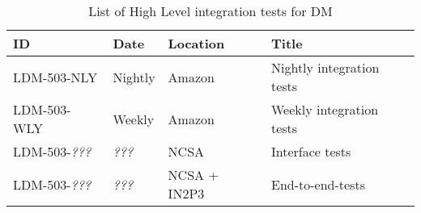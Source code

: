 \begin{longtable} {lllp{}}
\caption{List of High Level integration tests for DM \label{tab:schedule}} \\ %
\hline
\textbf{ID} & \textbf{Date} & \textbf{Location} & \textbf{Title} \\ \hline

LDM-503-NLY &
Nightly &
Amazon &
Nightly integration tests \\

LDM-503-WLY &
Weekly &
Amazon &
Weekly integration tests \\

LDM-503-\textit{???} &
\textit{???} &
NCSA &
Interface tests \\

LDM-503-\textit{???} &
\textit{???} &
NCSA + IN2P3 &
End-to-end-tests \\


\hline

\end{longtable}
